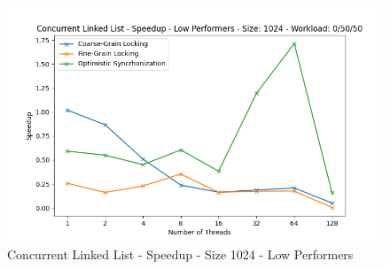 \documentclass[../final_report.tex]{subfiles}
\begin{document}
\begin{figure}[H]
        \includegraphics[scale=0.4]{outFiles/plots/concurrent_data_structs_low_speedup_1024_0_50_50.png}
    \caption{Concurrent Linked List - Speedup - Size 1024 - Low Performers}
    \label{fig:Concurrent Linked List - Speedup - Size 1024 - Low Performers}
\end{figure}
\end{document}
